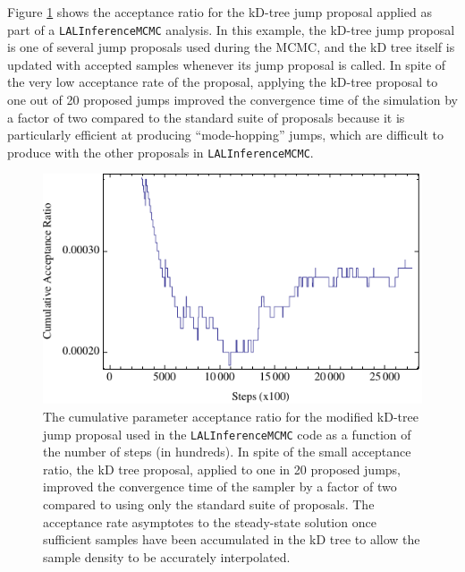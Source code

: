 \documentclass{iopart}
\newcommand{\ilya}[1]{{\color{red} \bf #1}}
\newcommand{\dan}[1]{{\color{magenta} \bf #1}}
\begin{document}
Figure \ref{fig:accratio} shows the acceptance ratio for the kD-tree jump
proposal applied as part of a \texttt{LALInferenceMCMC} analysis.  In this example, the kD-tree jump proposal is one of several jump proposals used during the MCMC, and the kD tree itself is updated with accepted samples whenever its jump proposal is called. In spite of the very low acceptance
rate of the proposal, applying the kD-tree proposal to one out of
20 proposed jumps improved the convergence time of the simulation
by a factor of two compared to the standard suite of proposals because
it is particularly efficient at producing ``mode-hopping'' jumps,
which are difficult to produce with the other proposals in
\texttt{LALInferenceMCMC}. 

\begin{figure}
  \begin{center}
    \includegraphics[width=0.8\columnwidth]{linearlog3}
  \end{center}
  \caption{\label{fig:accratio} The cumulative parameter acceptance
    ratio for the modified kD-tree jump proposal used in the
    \texttt{LALInferenceMCMC} code as a function of the number of
    steps (in hundreds). In spite of the small acceptance ratio, the
    kD tree proposal, applied to one in 20 proposed jumps,
    improved the convergence time of the sampler by a factor of two
    compared to using only the standard suite of proposals. 
    The acceptance rate asymptotes to the steady-state solution once sufficient samples have been accumulated in the kD tree to allow the sample density to be accurately interpolated.
}
\end{figure}
\end{document}
